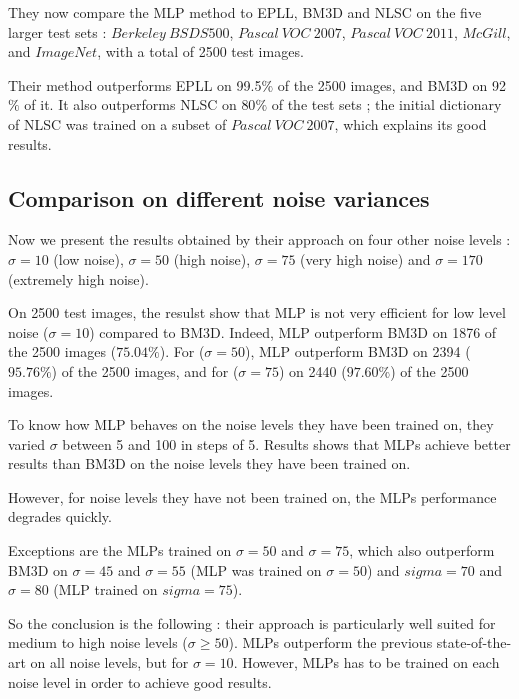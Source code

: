 \documentclass[10pt,a4paper]{article}
\newcommand{\svs}{\vspace{9pt}}
\begin{document}
\svs

They now compare the MLP method to EPLL, BM3D and NLSC on the five larger test sets : $Berkeley\ BSDS500$, $Pascal\ VOC\ 2007$, $Pascal\ VOC\ 2011$, $McGill$, and $ImageNet$, with a total of 2500 test images.

\svs

Their method outperforms EPLL on 99.5$\%$ of the 2500 images, and BM3D on 92$\%$ of it. It also outperforms NLSC on 80$\%$ of the test sets ; the initial dictionary of NLSC was trained on a subset of $Pascal\ VOC\ 2007$, which explains its good results.

\subsection{Comparison on different noise variances}

Now we present the results obtained by their approach on four other
noise levels : $\sigma = 10$ (low noise), $\sigma = 50$
(high noise), $\sigma = 75$ (very high noise) and $\sigma = 170$ (extremely high noise). 

\svs

On 2500 test images, the resulst show that MLP is not very efficient for low level noise ($\sigma=10$) compared to BM3D. Indeed, MLP outperform BM3D on 1876 of the 2500 images ($75.04\%$).
For ($\sigma = 50$), MLP outperform BM3D on 2394 ($95.76 \%$) of the 2500 images, and for ($\sigma = 75$) on 2440 ($97.60\%$) of the 2500 images.

\svs 

To know how MLP behaves on the noise levels they have been trained on, they varied $\sigma$ between 5 and 100 in steps of 5.
Results shows that MLPs achieve better results than BM3D on the noise levels they have been trained on.

\svs
However, for noise levels they have not been
trained on, the MLPs performance degrades quickly.

Exceptions are the MLPs trained on $\sigma = 50$ and $\sigma = 75$, which also outperform BM3D on $\sigma = 45$ and $\sigma = 55$ (MLP was trained on $\sigma = 50$) and $sigma = 70$ and $\sigma = 80$ (MLP trained on $sigma = 75$).

\svs

So the conclusion is the following : their approach is particularly well suited for medium to high noise
levels ($\sigma \geq 50$). MLPs outperform the previous state-of-the-art on all noise levels, but for $\sigma = 10$. However, MLPs has to be trained on each noise level in order to achieve good results.
\end{document}
